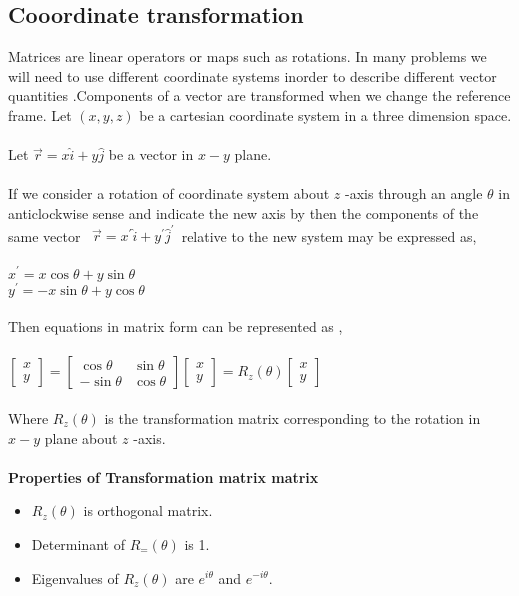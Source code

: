 \subsection{Cooordinate transformation}
Matrices are linear operators or maps such as rotations. In many problems we will need to use different coordinate systems inorder to describe different vector quantities .Components of a vector are transformed when we change the reference frame.
\newline Let $(x, y, z)$ be a cartesian coordinate system in a three dimension space. \\\\Let $\vec{r}=x \hat{i}+y \hat{j}$ be a vector in $x-y$ plane. \\\\If we consider a rotation of coordinate system about $z$ -axis through an angle $\theta$ in anticlockwise sense
and indicate the new axis by then the components of the same vector \ $\vec{r}=x^{\prime} \hat{i}+y^{\prime} \hat{j}^{\prime}$\  relative to the new system may be expressed as,
\\\\$x^{\prime}=x \cos \theta+y \sin \theta$\\
$y^{\prime}=-x \sin \theta+y \cos \theta$\\\\
Then equations in matrix form can be represented as ,\\\\
$\left[\begin{array}{l}x \\ y\end{array}\right]=\left[\begin{array}{cc}\cos \theta & \sin \theta \\ -\sin \theta & \cos \theta\end{array}\right]\left[\begin{array}{l}x \\ y\end{array}\right]=R_{z}(\theta)\left[\begin{array}{l}x \\ y\end{array}\right]$
\\\\
Where $R_{z}(\theta)$ is the transformation matrix corresponding to the rotation in $x-y$ plane about $z$ -axis.\\\\\textbf{Properties of Transformation matrix matrix}
\begin{itemize}
	\item $R_{z}(\theta)$ is orthogonal matrix.
	\item Determinant of $R_{=}(\theta)$ is 1.
	\item  Eigenvalues of $R_{z}(\theta)$ are $e^{i \theta}$ and $e^{-i \theta}$.
\end{itemize}
